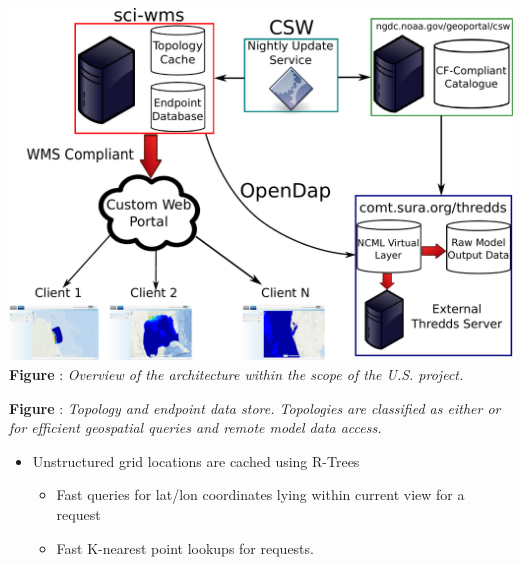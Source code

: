 \documentclass[noback,noborder,portrait,twocolumn]{cuposter}
\begin{document}
\begin{minipage}[t]{0.49\linewidth}
  \centering
  \includegraphics[width=\linewidth]{../figs/overview.pdf}
  \captionspace{}
  \textbf{Figure \getIncFigcounter{}}: \textit{Overview of the \sciwms{} architecture within the scope of the U.S. \ioos{} \comt{} project.}
\end{minipage}
\begin{minipage}[t]{0.49\linewidth}
  \centering
  \textbf{Figure \getIncFigcounter{}}: \textit{Topology and endpoint data store. Topologies are classified as either \cgrid{} or \ugrid{} for efficient geospatial queries and remote model data access.}
\end{minipage}


\figspace{}

\begin{itemize}
    \item Unstructured grid locations are cached using R-Trees
      \begin{itemize}
        \item Fast queries for lat/lon coordinates lying within
          current view for a \wms{} \getMap{} request
          
        \item Fast K-nearest point lookups for \getFeatureInfo{} requests.
      \end{itemize}
\end{itemize}
\end{document}
